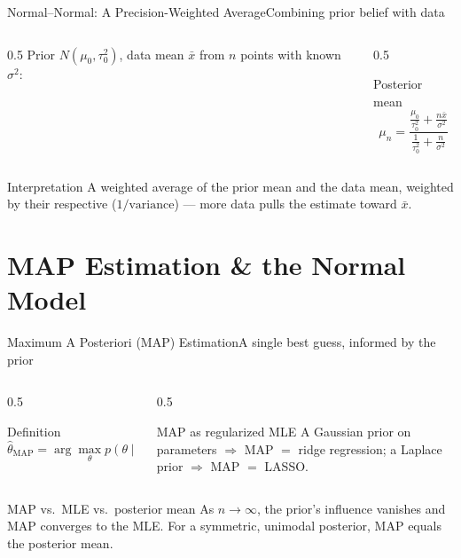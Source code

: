 \documentclass[aspectratio=169,11pt]{beamer}
\begin{document}
\begin{frame}{Normal--Normal: A Precision-Weighted Average}{Combining prior belief with data}
  \begin{columns}[T]
    \begin{column}{0.5\textwidth}
      \small Prior $N(\mu_0,\tau_0^2)$, data mean $\bar x$ from $n$ points
      with known $\sigma^2$:
    \end{column}
    \begin{column}{0.5\textwidth}
      \begin{exampleblock}{Posterior mean}
        \[ \mu_n = \frac{\frac{\mu_0}{\tau_0^2} + \frac{n\bar x}{\sigma^2}}
                        {\frac{1}{\tau_0^2} + \frac{n}{\sigma^2}} \]
      \end{exampleblock}
    \end{column}
  \end{columns}
  \vfill
  \begin{block}{Interpretation}
    \small A weighted average of the prior mean and the data mean, weighted
    by their respective  ($1/\text{variance}$) — more
    data pulls the estimate toward $\bar x$.
  \end{block}
\end{frame}

\section{MAP Estimation \& the Normal Model}

\begin{frame}{Maximum A Posteriori (MAP) Estimation}{A single best guess, informed by the prior}
  \begin{columns}[T]
    \begin{column}{0.5\textwidth}
      \begin{block}{Definition}
        \small
        \[ \hat\theta_{\text{MAP}} = \arg\max_\theta p(\theta\mid\text{data})
           = \arg\max_\theta L(\theta)\,p(\theta) \]
      \end{block}
    \end{column}
    \begin{column}{0.5\textwidth}
      \begin{exampleblock}{MAP as regularized MLE}
        \small A Gaussian prior on parameters $\Rightarrow$ MAP $=$ ridge
        regression; a Laplace prior $\Rightarrow$ MAP $=$ LASSO.
      \end{exampleblock}
    \end{column}
  \end{columns}
  \vfill
  \begin{alertblock}{MAP vs.\ MLE vs.\ posterior mean}
    \small As $n\to\infty$, the prior's influence vanishes and MAP
    converges to the MLE. For a symmetric, unimodal posterior, MAP equals
    the posterior mean.
  \end{alertblock}
\end{frame}
\end{document}
